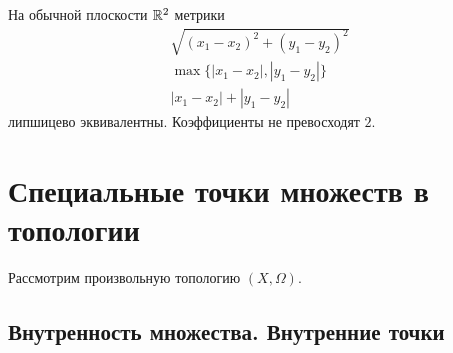 \documentclass[a4paper]{report}
\begin{document}
    На обычной плоскости $\mathbb{R}^2$ метрики
    \begin{gather*}
        \sqrt{(x_1 - x_2)^2 + (y_1 - y_2)^2}\\
        \max\{|x_1 - x_2|, |y_1 - y_2|\}\\
        |x_1 - x_2|+ |y_1 - y_2|
    \end{gather*} липшицево эквивалентны.
    Коэффициенты не превосходят $2$.


    \section{Специальные точки множеств в топологии}
    Рассмотрим произвольную топологию $(X, \Omega)$.

    \subsection{Внутренность множества. Внутренние точки}
\end{document}
